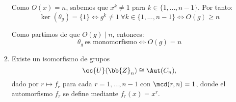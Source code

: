 \begin{ejercicio}
\begin{enumerate}
        Como $O(x)=n$, sabemos que $x^k\neq 1$ para $k\in \{1,\ldots,n-1\}$. Por tanto:
        \begin{equation*}
            \ker(\theta_g) = \{1\}\iff g^k\neq 1\ \forall k\in \{1,\ldots,n-1\}\iff O(g)\geq n
        \end{equation*}

        Como partimos de que $O(g)\mid n$, entonces:
        \begin{equation*}
            \theta_g\ \text{es monomorfismo} \iff O(g)=n
        \end{equation*}

        \begin{comment}

        \begin{description}
            \item[$\Longrightarrow)$] Supongamos que $\theta_g$ es monomorfismo, y veamos que $O(g)=n$. Como $O(g)\mid n$, entonces $O(g)\leq n$. Supongamos ahora $m\in \bb{Z}$ tal que $g^m=1$. Entonces:
            \begin{equation*}
                \theta_g(1)=1 =g^m=\theta_g(x)^m=\theta_g(x^m)
            \end{equation*}

            Por ser $\theta_g$ monomorfismo, entonces $x^m=1$, y por tanto $m\geq n$. Por tanto, $O(g)=n$.


            \item[$\Longleftarrow)$] Supongamos que $O(g)=n$, y veamos que $\theta_g$ es monomorfismo. Para ello, calculemos el núcleo de $\theta_g$:
            \begin{align*}
                \ker(\theta_g) &= \{x\in C_n\mid \theta_g(x)=1\}
                = \{x^k\mid k\in \{0,\ldots,n-1\},\quad \theta_g(x^k)=1\}\\
                &= \{x^k\mid k\in \{0,\ldots,n-1\},\quad g^k=1\}
            \end{align*}
            Como $O(g)=n$, entonces $g^k=1\iff k=0$. Por tanto, $\ker(\theta_g)=\{1\}$, y por tanto $\theta_g$ es monomorfismo.
        \end{description}
        \end{comment}
        
        \item Existe un isomorfismo de grupos
        \begin{equation*}
            \cc{U}(\bb{Z}_n) \cong \Aut(C_n),
        \end{equation*}
        dado por $r \mapsto f_r$ para cada $r = 1, \ldots, n-1$ con $\mcd(r, n) = 1$, donde el automorfismo $f_r$ se define mediante $f_r(x) = x^r$.


\end{enumerate}
\end{ejercicio}
